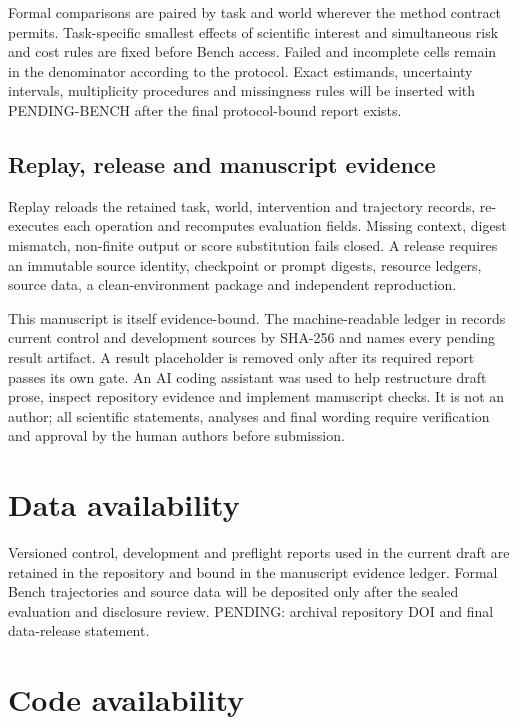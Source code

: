 \documentclass[11pt]{article}
\begin{document}
Formal comparisons are paired by task and world wherever the method contract permits. Task-specific smallest effects of scientific interest and simultaneous risk and cost rules are fixed before Bench access. Failed and incomplete cells remain in the denominator according to the protocol. Exact estimands, uncertainty intervals, multiplicity procedures and missingness rules will be inserted with PENDING-BENCH after the final protocol-bound report exists.

\subsection*{Replay, release and manuscript evidence}

Replay reloads the retained task, world, intervention and trajectory records, re-executes each operation and recomputes evaluation fields. Missing context, digest mismatch, non-finite output or score substitution fails closed. A release requires an immutable source identity, checkpoint or prompt digests, resource ledgers, source data, a clean-environment package and independent reproduction.

This manuscript is itself evidence-bound. The machine-readable ledger in  records current control and development sources by SHA-256 and names every pending result artifact. A result placeholder is removed only after its required report passes its own gate. An AI coding assistant was used to help restructure draft prose, inspect repository evidence and implement manuscript checks. It is not an author; all scientific statements, analyses and final wording require verification and approval by the human authors before submission.

\section*{Data availability}

Versioned control, development and preflight reports used in the current draft are retained in the repository and bound in the manuscript evidence ledger. Formal Bench trajectories and source data will be deposited only after the sealed evaluation and disclosure review. \textcolor{pending}{PENDING: archival repository DOI and final data-release statement.}

\section*{Code availability}
\end{document}
